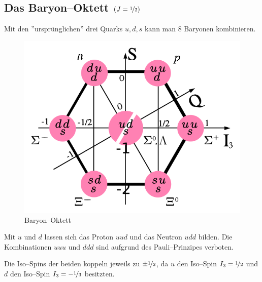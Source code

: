 \documentclass[Ex4_Zusammenfassung.tex]{subfiles}
\begin{document}
\subsection{Das Baryon--Oktett $(J=\nicefrac{1}{2})$}
Mit den ''ursprünglichen'' drei Quarks 	$u,d,s$ kann man 8 Baryonen kombinieren.
\begin{figure}[h]
	\centering
	\includegraphics[scale=0.4]{Baryon-octet.png}
	\caption{Baryon--Oktett}
\end{figure}
Mit $u$ und $d$ lassen sich das Proton $uud$ und das Neutron $udd$ bilden. Die Kombinationen $uuu$ und $ddd$ sind aufgrund des Pauli--Prinzipes verboten. 

Die Iso--Spins der beiden koppeln jeweils zu $\pm \nicefrac{1}{2}$, da $u$ den Iso--Spin $I_3 = \nicefrac{1}{2}$ und $d$ den Iso--Spin $I_3 = -\nicefrac{1}{3}$ besitzten. 
\end{document}
